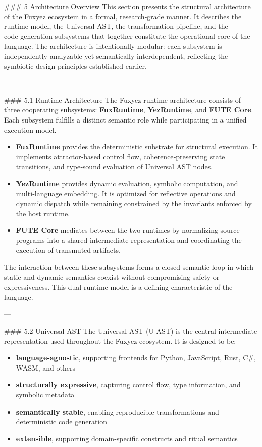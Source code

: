 \documentclass[12pt, a4paper]{book}
\begin{document}
    
    \#\#\# 5 Architecture Overview  
This section presents the structural architecture of the Fuxyez ecosystem in a formal, research‑grade manner. It describes the runtime model, the Universal AST, the transformation pipeline, and the code‑generation subsystems that together constitute the operational core of the language. The architecture is intentionally modular: each subsystem is independently analyzable yet semantically interdependent, reflecting the symbiotic design principles established earlier.

---

\#\#\# 5.1 Runtime Architecture  
The Fuxyez runtime architecture consists of three cooperating subsystems: \textbf{FuxRuntime}, \textbf{YezRuntime}, and \textbf{FUTE Core}. Each subsystem fulfills a distinct semantic role while participating in a unified execution model.

\begin{itemize}
  \item \textbf{FuxRuntime} provides the deterministic substrate for structural execution. It implements attractor‑based control flow, coherence‑preserving state transitions, and type‑sound evaluation of Universal AST nodes.  
  \item \textbf{YezRuntime} provides dynamic evaluation, symbolic computation, and multi‑language embedding. It is optimized for reflective operations and dynamic dispatch while remaining constrained by the invariants enforced by the host runtime.  
  \item \textbf{FUTE Core} mediates between the two runtimes by normalizing source programs into a shared intermediate representation and coordinating the execution of transmuted artifacts.
\end{itemize}

The interaction between these subsystems forms a closed semantic loop in which static and dynamic semantics coexist without compromising safety or expressiveness. This dual‑runtime model is a defining characteristic of the language.

---

\#\#\# 5.2 Universal AST  
The Universal AST (U‑AST) is the central intermediate representation used throughout the Fuxyez ecosystem. It is designed to be:

\begin{itemize}
  \item \textbf{language‑agnostic}, supporting frontends for Python, JavaScript, Rust, C\#, WASM, and others  
  \item \textbf{structurally expressive}, capturing control flow, type information, and symbolic metadata  
  \item \textbf{semantically stable}, enabling reproducible transformations and deterministic code generation  
  \item \textbf{extensible}, supporting domain‑specific constructs and ritual semantics  
\end{itemize}
\end{document}
